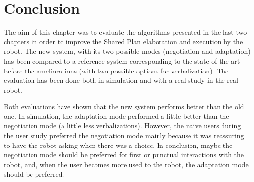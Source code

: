 \documentclass[english,a4paper,11pt,twoside]{StyleThese}
\begin{document}
\section{Conclusion}

The aim of this chapter was to evaluate the algorithms presented in the last two chapters in order to improve the Shared Plan elaboration and execution by the robot. The new system, with its two possible modes (negotiation and adaptation) has been compared to a reference system corresponding to the state of the art before the ameliorations (with two possible options for verbalization). The evaluation has been done both in simulation and with a real study in the real robot. 

Both evaluations have shown that the new system performs better than the old one. In simulation, the adaptation mode performed a little better than the negotiation mode (a little less verbalizations). However, the naive users during the user study preferred the negotiation mode mainly because it was reassuring to have the robot asking when there was a choice. In conclusion, maybe the negotiation mode should be preferred for first or punctual interactions with the robot, and, when the user becomes more used to the robot, the adaptation mode should be preferred.

\ifdefined{}
\else


\end{document}
